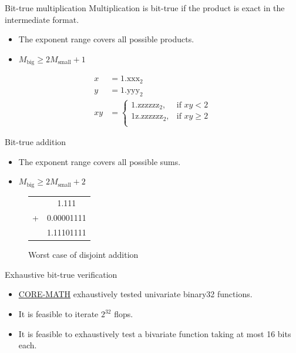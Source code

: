 \documentclass{beamer}
\begin{document}
\begin{frame}{Bit-true multiplication}
	Multiplication is bit-true if the product is exact in the intermediate format.
	\begin{itemize}
		\item The exponent range covers all possible products.
		\item $M_{\text{big}} \ge 2M_{\text{small}} + 1$
	\end{itemize}

	\begin{example}
		\begin{align*}
			x  & = 1.\text{xxx}_2 \\
			y  & = 1.\text{yyy}_2 \\
			xy & =
			\begin{cases}
				1.\text{zzzzzz}_2,          & \text{if } xy < 2   \\
				1\text{z}.\text{zzzzzz}_2 , & \text{if } xy \ge 2 \\
			\end{cases}
		\end{align*}
	\end{example}
\end{frame}

\begin{frame}{Bit-true addition}
	\begin{itemize}
		\item The exponent range covers all possible sums.
		\item $M_{\text{big}} \ge 2M_{\text{small}} + 2$
	\end{itemize}

	\begin{figure}
		\begin{tabular}{l S[table-format=2.8]}
			  & 1.111      \\
			+ & 0.00001111 \\
			\hline
			  & 1.11101111
		\end{tabular}
		\caption{Worst case of disjoint addition}
	\end{figure}
\end{frame}

\begin{frame}{Exhaustive bit-true verification}
	\begin{itemize}
		\item \href{https://core-math.gitlabpages.inria.fr/}{CORE-MATH} exhaustively tested univariate binary32 functions.
		\item It is feasible to iterate $2^{32}$ flops.
		\item It is feasible to exhaustively test a bivariate function taking at most 16 bits each.
	\end{itemize}
\end{frame}
\end{document}
